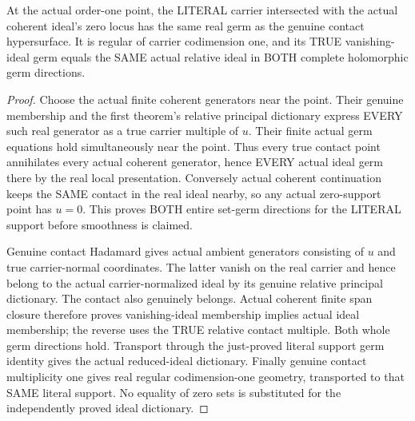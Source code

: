 \begin{theorem}
\label{hir:sharp-actual-relative-principal-order-one-reduced-trace}
\leanok
At the actual order-one point, the LITERAL carrier intersected with the
actual coherent ideal's zero locus has the same real germ as the genuine
contact hypersurface. It is regular of carrier codimension one, and its
TRUE vanishing-ideal germ equals the SAME actual relative ideal in BOTH
complete holomorphic germ directions.
\end{theorem}
\begin{proof}
Choose the actual finite coherent generators near the point. Their genuine
membership and the first theorem's relative principal dictionary express
EVERY such real generator as a true carrier multiple of $u$. Their finite
actual germ equations hold simultaneously near the point. Thus every true
contact point annihilates every actual coherent generator, hence EVERY
actual ideal germ there by the real local presentation. Conversely actual
coherent continuation keeps the SAME contact in the real ideal nearby, so
any actual zero-support point has $u=0$. This proves BOTH entire set-germ
directions for the LITERAL support before smoothness is claimed.

Genuine contact Hadamard gives actual ambient generators consisting of $u$
and true carrier-normal coordinates. The latter vanish on the real carrier
and hence belong to the actual carrier-normalized ideal by its genuine
relative principal dictionary. The contact also genuinely belongs. Actual
coherent finite span closure therefore proves vanishing-ideal membership
implies actual ideal membership; the reverse uses the TRUE relative contact
multiple. Both whole germ directions hold. Transport through the just-proved
literal support germ identity gives the actual reduced-ideal dictionary.
Finally genuine contact multiplicity one gives real regular codimension-one
geometry, transported to that SAME literal support. No equality of zero sets
is substituted for the independently proved ideal dictionary.
\end{proof}

